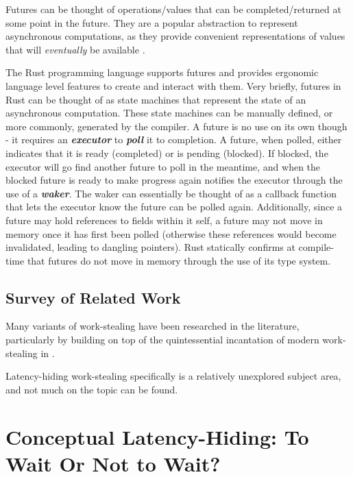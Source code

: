 \documentclass[bsc,frontabs,singlespacing,parskip,deptreport,normalheadings]{infthesis}
\begin{document}
Futures can be thought of operations/values that can be completed/returned at
some point in the future. They are a popular abstraction to represent
asynchronous computations, as they provide convenient representations of values
that will \textit{eventually} be available \cite{halstead_implementation_1984,
halstead_multilisp_1985}.

The Rust programming language supports futures and provides ergonomic language
level features to create and interact with them. Very briefly, futures in Rust
can be thought of as state machines that represent the state of an asynchronous
computation. These state machines can be manually defined, or more commonly,
generated by the compiler. A future is no use on its own though - it requires an
\textit{\textbf{executor}} to \textbf{\textit{poll}} it to completion. A future,
when polled, either indicates that it is ready (completed) or is pending
(blocked). If blocked, the executor will go find another future to poll in the
meantime, and when the blocked future is ready to make progress again notifies
the executor through the use of a \textbf{\textit{waker}}. The waker can
essentially be thought of as a callback function that lets the executor know the
future can be polled again. Additionally, since a future may hold references to
fields within it self, a future may not move in memory once it has first been
polled (otherwise these references would become invalidated, leading to dangling
pointers). Rust statically confirms at compile-time that futures do not move in
memory through the use of its type system.

\section{Survey of Related Work}

Many variants of work-stealing have been researched in the literature,
particularly by building on top of the quintessential incantation of modern
work-stealing in \cite{arora_thread_1998}. 

Latency-hiding work-stealing specifically is a relatively unexplored subject
area, and not much on the topic can be found.


\chapter{Conceptual Latency-Hiding: To Wait Or Not to Wait?}
\label{chapter:conceptual_latency-hiding:_to_wait_or_not_to_wait?}
\end{document}
